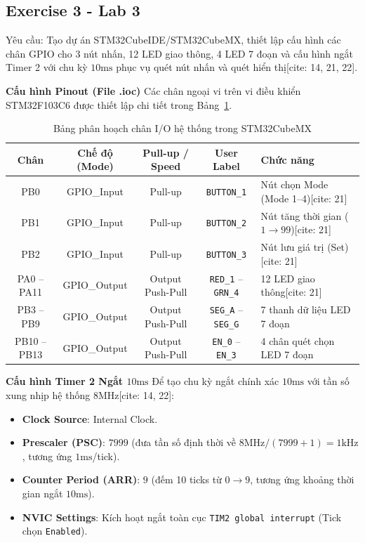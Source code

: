 \subsection{Exercise 3 - Lab 3}

Yêu cầu: Tạo dự án STM32CubeIDE/STM32CubeMX, thiết lập cấu hình các chân GPIO cho 3 nút nhấn, 12 LED giao thông, 4 LED 7 đoạn và cấu hình ngắt Timer 2 với chu kỳ $10\text{ms}$ phục vụ quét nút nhấn và quét hiển thị[cite: 14, 21, 22].

\textbf{Cấu hình Pinout (File .ioc)}
Các chân ngoại vi trên vi điều khiển STM32F103C6 được thiết lập chi tiết trong Bảng~\ref{tab:ex3_pinout}.

\begin{table}[htbp]
\centering
\caption{Bảng phân hoạch chân I/O hệ thống trong STM32CubeMX}
\label{tab:ex3_pinout}
\begin{tabular}{|c|c|c|c|l|}
\hline
\textbf{Chân} & \textbf{Chế độ (Mode)} & \textbf{Pull-up / Speed} & \textbf{User Label} & \textbf{Chức năng} \\ \hline
PB0 & GPIO\_Input & Pull-up & \texttt{BUTTON\_1} & Nút chọn Mode (Mode 1--4)[cite: 21] \\ \hline
PB1 & GPIO\_Input & Pull-up & \texttt{BUTTON\_2} & Nút tăng thời gian ($1 \rightarrow 99$)[cite: 21] \\ \hline
PB2 & GPIO\_Input & Pull-up & \texttt{BUTTON\_3} & Nút lưu giá trị (Set)[cite: 21] \\ \hline
PA0 -- PA11 & GPIO\_Output & Output Push-Pull & \texttt{RED\_1} -- \texttt{GRN\_4} & 12 LED giao thông[cite: 21] \\ \hline
PB3 -- PB9 & GPIO\_Output & Output Push-Pull & \texttt{SEG\_A} -- \texttt{SEG\_G} & 7 thanh dữ liệu LED 7 đoạn \\ \hline
PB10 -- PB13 & GPIO\_Output & Output Push-Pull & \texttt{EN\_0} -- \texttt{EN\_3} & 4 chân quét chọn LED 7 đoạn \\ \hline
\end{tabular}
\end{table}

\textbf{Cấu hình Timer 2 Ngắt $10\text{ms}$}
Để tạo chu kỳ ngắt chính xác $10\text{ms}$ với tần số xung nhịp hệ thống $8\text{MHz}$[cite: 14, 22]:
\begin{itemize}
    \item \textbf{Clock Source}: Internal Clock.
    \item \textbf{Prescaler (PSC)}: $7999$ (đưa tần số định thời về $8\text{MHz} / (7999 + 1) = 1\text{kHz}$, tương ứng $1\text{ms}$/tick).
    \item \textbf{Counter Period (ARR)}: $9$ (đếm 10 ticks từ $0 \rightarrow 9$, tương ứng khoảng thời gian ngắt $10\text{ms}$).
    \item \textbf{NVIC Settings}: Kích hoạt ngắt toàn cục \texttt{TIM2 global interrupt} (Tick chọn \texttt{Enabled}).
\end{itemize}

